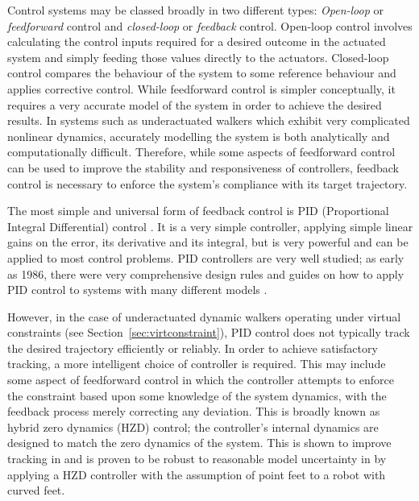 Control systems may be classed broadly in two different types: \textit{Open-loop} or \textit{feedforward} control and \textit{closed-loop} or \textit{feedback} control. Open-loop control involves calculating the control inputs required for a desired outcome in the actuated system and simply feeding those values directly to the actuators. Closed-loop control compares the behaviour of the system to some reference behaviour and applies corrective control. While feedforward control is simpler conceptually, it requires a very accurate model of the system in order to achieve the desired results. In systems such as underactuated walkers which exhibit very complicated nonlinear dynamics, accurately modelling the system is both analytically and computationally difficult. Therefore, while some aspects of feedforward control can be used to improve the stability and responsiveness of controllers, feedback control is necessary to enforce the system's compliance with its target trajectory.

The most simple and universal form of feedback control is PID (Proportional Integral Differential) control \cite{aastrom2001future}. It is a very simple controller, applying simple linear gains on the error, its derivative and its integral, but is very powerful and can be applied to most control problems. PID controllers are very well studied; as early as 1986, there were very comprehensive design rules and guides on how to apply PID control to systems with many different models \cite{rivera1986internal}. %

However, in the case of underactuated dynamic walkers operating under virtual constraints (see Section~\ref{sec:virtconstraint}), PID control does not typically track the desired trajectory efficiently or reliably. In order to achieve satisfactory tracking, a more intelligent choice of controller is required. This may include some aspect of feedforward control in which the controller attempts to enforce the constraint based upon some knowledge of the system dynamics, with the feedback process merely correcting any deviation. This is broadly known as hybrid zero dynamics (HZD) control; the controller's internal dynamics are designed to match the zero dynamics of the system. This is shown to improve tracking in \cite{sreenath2011compliant} and is proven to be robust to reasonable model uncertainty in \cite{martin2014design} by applying a HZD controller with the assumption of point feet to a robot with curved feet. 


